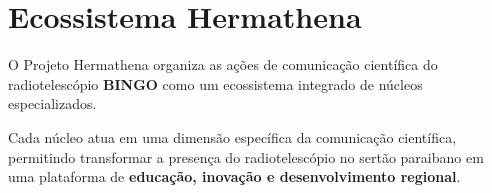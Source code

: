 \section{Ecossistema Hermathena}

O Projeto Hermathena organiza as ações de comunicação científica do radiotelescópio \textbf{BINGO} como um ecossistema integrado de núcleos especializados.

Cada núcleo atua em uma dimensão específica da comunicação científica, permitindo transformar a presença do radiotelescópio no sertão paraibano em uma plataforma de \textbf{educação, inovação e desenvolvimento regional}.